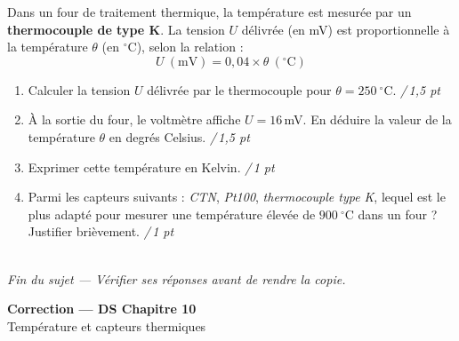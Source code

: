 \documentclass[a4paper,11pt]{article}
\newcommand{\pt}[1]{\hfill\textcolor{gris}{\small\textit{/\,#1 pt}}}
\begin{document}
\begin{enonce}
Dans un four de traitement thermique, la température est mesurée par un \textbf{thermocouple de type K}. La tension $U$ délivrée (en mV) est proportionnelle à la température $\theta$ (en $^\circ$C), selon la relation :
\[ U\ (\text{mV}) = 0{,}04 \times \theta\ (^\circ\text{C}) \]
\end{enonce}

\begin{enumerate}[label=\textbf{\arabic*.},leftmargin=*,itemsep=4pt]

\item Calculer la tension $U$ délivrée par le thermocouple pour $\theta = 250\ ^\circ$C. \pt{1,5}

\vspace{1.6cm}

\item À la sortie du four, le voltmètre affiche $U = 16$\,mV. En déduire la valeur de la température $\theta$ en degrés Celsius. \pt{1,5}

\vspace{1.6cm}

\item Exprimer cette température en Kelvin. \pt{1}

\vspace{1.2cm}

\item Parmi les capteurs suivants : \emph{CTN}, \emph{Pt100}, \emph{thermocouple type K}, lequel est le plus adapté pour mesurer une température élevée de $900\ ^\circ$C dans un four ? Justifier brièvement. \pt{1}

\vspace{1.6cm}
\end{enumerate}

\vspace{4pt}
\hrulefill\\[2pt]
\hfill\textit{\small Fin du sujet — Vérifier ses réponses avant de rendre la copie.}

\newpage
\begin{center}
{\Large\bfseries\color{violet} Correction — DS Chapitre 10}\\[2pt]
{\small Température et capteurs thermiques}
\end{center}
\end{document}
